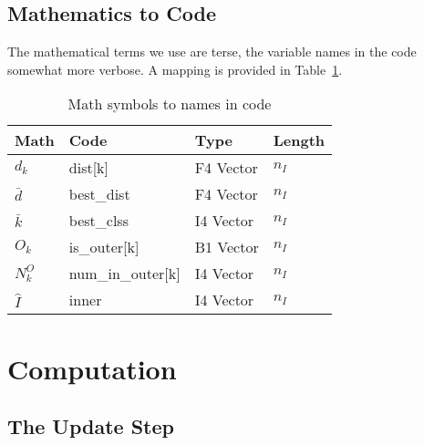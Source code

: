 \subsection{Mathematics to Code}
\label{math_to_code}
The mathematical terms we use are terse, the variable names in the code somewhat
more verbose. A mapping is provided in Table~\ref{tbl_mapping}.
\begin{table}[htbp]
\centering
\begin{tabular}{|l|l|l|l|} \hline
{\bf Math} & {\bf Code}     & {\bf Type} & {\bf Length} \\ \hline
\(d_k\) & dist[k] & F4 Vector & \(n_I\) \\ \hline
\(\bar{d}\) & best\_dist & F4 Vector & \(n_I\) \\ \hline
\(\bar{k}\) & best\_clss & I4 Vector & \(n_I\) \\ \hline
\(O_k\) & is\_outer[k] & B1 Vector & \(n_I\)  \\ \hline
\(N^O_k\) & num\_in\_outer[k] & I4 Vector & \(n_I\)  \\ \hline
\(\hat{I}\) & inner & I4 Vector & \(n_I\) \\ \hline
\hline
\end{tabular}
\caption{Math symbols to names in code}
\label{tbl_mapping}
\end{table}


\section{Computation}

\subsection{The Update Step}
\label{update}

